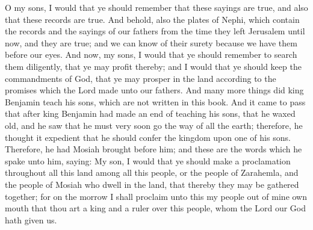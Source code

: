 \bverse \iffalse O my sons, I would that ye should remember that these sayings are true, and also that these records are true. And behold, also the plates of Nephi, which contain the records and the sayings of our fathers from the time they left Jerusalem until now, and they are true; and we can know of their surety because we have them before our eyes. \fi
O my sons, I would that ye should remember that these sayings are true, and also that these records are true. And behold, also the plates of Nephi, which contain the records and the sayings of our fathers from the time they left Jerusalem until now, and they are true; and we can know of their surety because we have them before our eyes.
\bverse \iffalse And now, my sons, I would that ye should remember to search them diligently, that ye may profit thereby; and I would that ye should keep the commandments of God, that ye may prosper in the land according to the promises which the Lord made unto our fathers. \fi
And now, my sons, I would that ye should remember to search them diligently, that ye may profit thereby; and I would that ye should keep the commandments of God, that ye may prosper in the land according to the promises which the Lord made unto our fathers.
\bverse \iffalse And many more things did king Benjamin teach his sons, which are not written in this book. \fi
And many more things did king Benjamin teach his sons, which are not written in this book.
\bverse \iffalse And it came to pass that after king Benjamin had made an end of teaching his sons, that he waxed old, and he saw that he must very soon go the way of all the earth; therefore, he thought it expedient that he should confer the kingdom upon one of his sons. \fi
And it came to pass that after king Benjamin had made an end of teaching his sons, that he waxed old, and he saw that he must very soon go the way of all the earth; therefore, he thought it expedient that he should confer the kingdom upon one of his sons.
\bverse \iffalse Therefore, he had Mosiah brought before him; and these are the words which he spake unto him, saying: My son, I would that ye should make a proclamation throughout all this land among all this people, or the people of Zarahemla, and the people of Mosiah who dwell in the land, that thereby they may be gathered together; for on the morrow I shall proclaim unto this my people out of mine own mouth that thou art a king and a ruler over this people, whom the Lord our God hath given us. \fi
Therefore, he had Mosiah brought before him; and these are the words which he spake unto him, saying: My son, I would that ye should make a proclamation throughout all this land among all this people, or the people of Zarahemla, and the people of Mosiah who dwell in the land, that thereby they may be gathered together; for on the morrow I shall proclaim unto this my people out of mine own mouth that thou art a king and a ruler over this people, whom the Lord our God hath given us.
